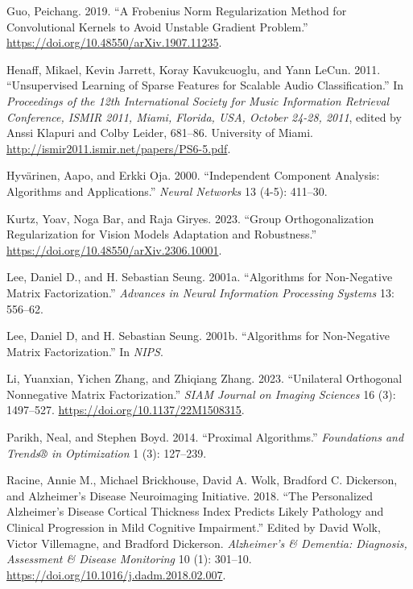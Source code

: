 \documentclass[
]{article}
\newlength{\cslhangindent}
\newenvironment{CSLReferences}[2] %
 {\begin{list}{}{%
  \setlength{\itemindent}{0pt}
  \setlength{\leftmargin}{0pt}
  \setlength{\parsep}{0pt}
  \ifodd #1
   \setlength{\leftmargin}{\cslhangindent}
   \setlength{\itemindent}{-1\cslhangindent}
  \fi
  \setlength{\itemsep}{#2\baselineskip}}}
 {\end{list}}
\begin{document}
\begin{CSLReferences}{1}{0}
Guo, Peichang. 2019. {``A Frobenius Norm Regularization Method for Convolutional Kernels to Avoid Unstable Gradient Problem.''} \url{https://doi.org/10.48550/arXiv.1907.11235}.

Henaff, Mikael, Kevin Jarrett, Koray Kavukcuoglu, and Yann LeCun. 2011. {``Unsupervised Learning of Sparse Features for Scalable Audio Classification.''} In \emph{Proceedings of the 12th International Society for Music Information Retrieval Conference, {ISMIR} 2011, Miami, Florida, USA, October 24-28, 2011}, edited by Anssi Klapuri and Colby Leider, 681--86. University of Miami. \url{http://ismir2011.ismir.net/papers/PS6-5.pdf}.

Hyvärinen, Aapo, and Erkki Oja. 2000. {``Independent Component Analysis: Algorithms and Applications.''} \emph{Neural Networks} 13 (4-5): 411--30.

Kurtz, Yoav, Noga Bar, and Raja Giryes. 2023. {``Group Orthogonalization Regularization for Vision Models Adaptation and Robustness.''} \url{https://doi.org/10.48550/arXiv.2306.10001}.

Lee, Daniel D., and H. Sebastian Seung. 2001a. {``Algorithms for Non-Negative Matrix Factorization.''} \emph{Advances in Neural Information Processing Systems} 13: 556--62.

Lee, Daniel D, and H. Sebastian Seung. 2001b. {``Algorithms for Non-Negative Matrix Factorization.''} In \emph{NIPS}.

Li, Yuanxian, Yichen Zhang, and Zhiqiang Zhang. 2023. {``Unilateral Orthogonal Nonnegative Matrix Factorization.''} \emph{SIAM Journal on Imaging Sciences} 16 (3): 1497--527. \url{https://doi.org/10.1137/22M1508315}.

Parikh, Neal, and Stephen Boyd. 2014. {``Proximal Algorithms.''} \emph{Foundations and Trends® in Optimization} 1 (3): 127--239.

Racine, Annie M., Michael Brickhouse, David A. Wolk, Bradford C. Dickerson, and Alzheimer's Disease Neuroimaging Initiative. 2018. {``The Personalized {Alzheimer}'s Disease Cortical Thickness Index Predicts Likely Pathology and Clinical Progression in Mild Cognitive Impairment.''} Edited by David Wolk, Victor Villemagne, and Bradford Dickerson. \emph{Alzheimer's \& Dementia: Diagnosis, Assessment \& Disease Monitoring} 10 (1): 301--10. \url{https://doi.org/10.1016/j.dadm.2018.02.007}.


\end{CSLReferences}
\end{document}
